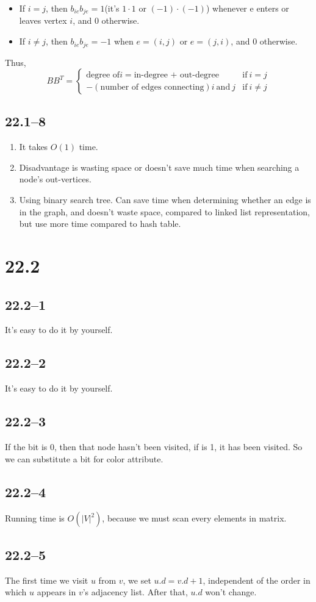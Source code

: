 \documentclass{article}
\begin{document}
\begin{itemize}
\item If $i = j$, then $b_{ie}b_{je} = 1$(it's $1\cdot1$ or $(-1)\cdot(-1)$)
whenever e enters or leaves vertex $i$, and 0 otherwise.
\item If $i \ne j$, then $b_{ie}b_{je} = -1$ when $e = (i, j)$ or $e = (j, i)$,
and 0 otherwise.
\end{itemize}
Thus,\\
\begin{displaymath}
  BB^T  = \left\{ \begin{array}{lr}
\textrm{degree of} i = \textrm{in-degree + out-degree} & \textrm{if}~i = j\\
-(\textrm{number of edges connecting}) i~\textrm{and}~j& \textrm{if}~ i \ne j
\end{array} \right.
\end{displaymath}

\subsection*{22.1--8}
\begin{enumerate}
\item It takes $O(1)$ time.
\item Disadvantage is wasting space or doesn't save much time when
searching a node's out-vertices.
\item Using binary search tree. Can save time when determining whether an
edge is in the graph, and doesn't waste space, compared to linked list
representation, but use more time compared to hash table.
\end{enumerate}

\section*{22.2}
\subsection*{22.2--1}
It's easy to do it by yourself.

\subsection*{22.2--2}
It's easy to do it by yourself.

\subsection*{22.2--3}
If the bit is 0, then that node hasn't been visited, if is 1, it has been
visited. So we can substitute a bit for color attribute.

\subsection*{22.2--4}
Running time is $O(|V|^2)$, because we must scan every elements in matrix.

\subsection*{22.2--5}
The first time we visit $u$ from $v$, we set $u.d = v.d + 1$, independent of the order in which $u$ appears in $v$'s adjacency list. After that, $u.d$
won't change.
\end{document}
